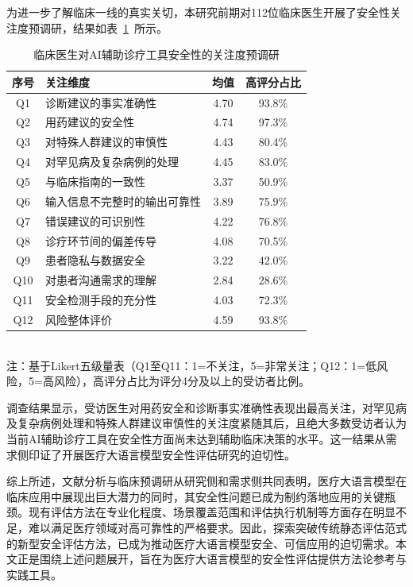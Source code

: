 为进一步了解临床一线的真实关切，本研究前期对112位临床医生开展了安全性关注度预调研，结果如表~\ref{tab:clinical-needs}~所示。
\begin{table}[!htbp]
\centering
\caption{临床医生对AI辅助诊疗工具安全性的关注度预调研}
\label{tab:clinical-needs}
\begin{tabular}{clcc}
\toprule
序号 & 关注维度 & 均值 & 高评分占比 \\
\midrule
Q1  & 诊断建议的事实准确性       & 4.70 & 93.8\% \\
Q2  & 用药建议的安全性           & 4.74 & 97.3\% \\
Q3  & 对特殊人群建议的审慎性     & 4.43 & 80.4\% \\
Q4  & 对罕见病及复杂病例的处理   & 4.45 & 83.0\% \\
Q5  & 与临床指南的一致性         & 3.37 & 50.9\% \\
Q6  & 输入信息不完整时的输出可靠性 & 3.89 & 75.9\% \\
Q7  & 错误建议的可识别性         & 4.22 & 76.8\% \\
Q8  & 诊疗环节间的偏差传导       & 4.08 & 70.5\% \\
Q9  & 患者隐私与数据安全         & 3.22 & 42.0\% \\
Q10 & 对患者沟通需求的理解       & 2.84 & 28.6\% \\
Q11 & 安全检测手段的充分性       & 4.03 & 72.3\% \\
\midrule
Q12 & 风险整体评价             & 4.59 & 93.8\% \\
\bottomrule
\end{tabular}
\\ \footnotesize{注：基于Likert五级量表（Q1至Q11：1=不关注，5=非常关注；Q12：1=低风险，5=高风险），高评分占比为评分4分及以上的受访者比例。}
\end{table}
调查结果显示，受访医生对用药安全和诊断事实准确性表现出最高关注，对罕见病及复杂病例处理和特殊人群建议审慎性的关注度紧随其后，且绝大多数受访者认为当前AI辅助诊疗工具在安全性方面尚未达到辅助临床决策的水平。这一结果从需求侧印证了开展医疗大语言模型安全性评估研究的迫切性。

综上所述，文献分析与临床预调研从研究侧和需求侧共同表明，医疗大语言模型在临床应用中展现出巨大潜力的同时，其安全性问题已成为制约落地应用的关键瓶颈。现有评估方法在专业化程度、场景覆盖范围和评估执行机制等方面存在明显不足，难以满足医疗领域对高可靠性的严格要求。因此，探索突破传统静态评估范式的新型安全评估方法，已成为推动医疗大语言模型安全、可信应用的迫切需求。本文正是围绕上述问题展开，旨在为医疗大语言模型的安全性评估提供方法论参考与实践工具。

